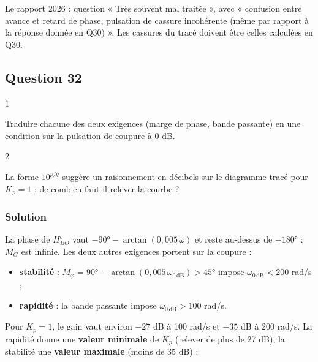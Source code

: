 \documentclass[11pt,a4paper]{article}
\providecommand{\tightlist}{\setlength{\itemsep}{0pt}\setlength{\parskip}{0pt}}
\begin{document}
\begin{jury}

Le rapport 2026 : question « Très souvent mal traitée », avec « confusion entre avance et retard de phase, pulsation de cassure incohérente (même par rapport à la réponse donnée en Q30) ». Les cassures du tracé doivent être celles calculées en Q30.

\end{jury}

\hypertarget{question-32}{%
\subsection{Question 32}\label{question-32}}

\begin{indication}{1}

Traduire chacune des deux exigences (marge de phase, bande passante) en une condition sur la pulsation de coupure à 0 dB.

\end{indication}

\begin{indication}{2}

La forme \(10^{p/q}\) suggère un raisonnement en décibels sur le diagramme tracé pour \(K_p = 1\) : de combien faut-il relever la courbe ?

\end{indication}

\hypertarget{solution-31}{%
\subsubsection{Solution}\label{solution-31}}

La phase de \(H_{BO}^c\) vaut \(-90° - \arctan(0{,}005\,\omega)\) et reste au-dessus de \(-180°\) : \(M_G\) est infinie. Les deux autres exigences portent sur la coupure :

\begin{itemize}
\tightlist
\item
  \textbf{stabilité} : \(M_\varphi = 90° - \arctan(0{,}005\,\omega_{0\,\text{dB}}) > 45°\) impose \(\omega_{0\,\text{dB}} < 200\) rad/s ;
\item
  \textbf{rapidité} : la bande passante impose \(\omega_{0\,\text{dB}} > 100\) rad/s.
\end{itemize}

Pour \(K_p = 1\), le gain vaut environ \(-27\) dB à 100 rad/s et \(-35\) dB à 200 rad/s. La rapidité donne une \textbf{valeur minimale} de \(K_p\) (relever de plus de 27 dB), la stabilité une \textbf{valeur maximale} (moins de 35 dB) :
\end{document}
